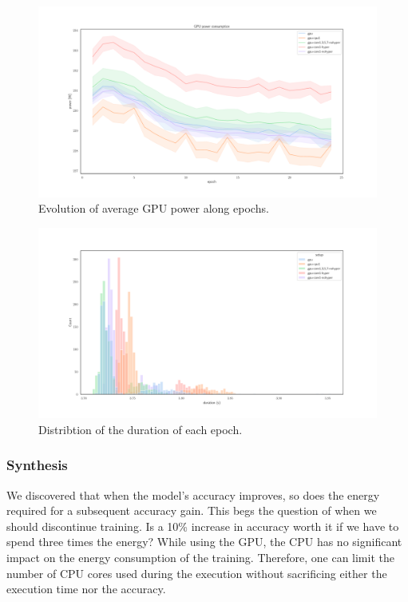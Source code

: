 \begin{figure}
    \centering
    \includegraphics[width=\linewidth]{imgs/power_gpu_baedonepoche.pdf}
    \caption{Evolution of average GPU power along epochs.}
    \label{fig:ephoch_power}
\end{figure}


\begin{figure}
    \centering
    \includegraphics[width=\linewidth]{imgs/epoch_duration.pdf}
    \caption{Distribtion of the duration of each epoch.}
    \label{fig:epoch_duration}
\end{figure}
\subsubsection{Synthesis}
We discovered that when the model's accuracy improves, so does the energy required for a subsequent accuracy gain.
This begs the question of when we should discontinue training.
Is a 10\% increase in accuracy worth it if we have to spend three times the energy?
While using the GPU, the CPU has no significant impact on the energy consumption of the training. Therefore, one can limit the number of CPU cores used during the execution without sacrificing either the execution time nor the accuracy.



